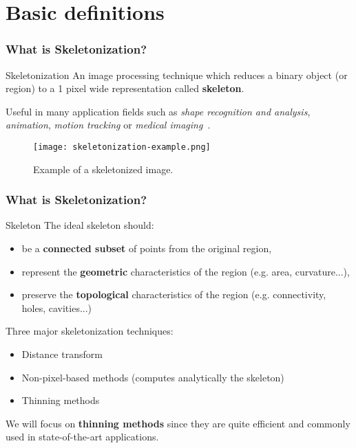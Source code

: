 \section{Basic definitions}
\begin{frame}
  \frametitle{What is Skeletonization?}
  \begin{block}{Skeletonization}
    An image processing technique which reduces a binary object (or region) to a 1 pixel wide representation called \textbf{skeleton}.
  \end{block}
  Useful in many application fields such as \emph{shape recognition and analysis}, \emph{animation}, \emph{motion tracking} or \emph{medical imaging}~\cite{skel-applications}.
  \begin{figure}
    \begin{center}
      \texttt{[image: skeletonization-example.png]}
      \caption{Example of a skeletonized image.}
    \end{center}
  \end{figure}
\end{frame}

\begin{frame}
  \label{sli:skeleton}
  \frametitle{What is Skeletonization?}
  \begin{block}{Skeleton}
    The ideal skeleton should:
    \begin{itemize}
      \item be a \textbf{connected subset} of points from the original region,
      \item represent the \textbf{geometric} characteristics of the region (e.g. area, curvature...),
      \item preserve the \textbf{topological} characteristics of the region (e.g. connectivity, holes, cavities...)
    \end{itemize}
  \end{block}

  Three major skeletonization techniques:
  \begin{itemize}
    \item Distance transform
    \item Non-pixel-based methods (computes analytically the skeleton)
    \item Thinning methods
  \end{itemize}
  \vspace{0.5cm}
  We will focus on \textbf{thinning methods} since they are quite efficient and commonly used in state-of-the-art applications.
\end{frame}
